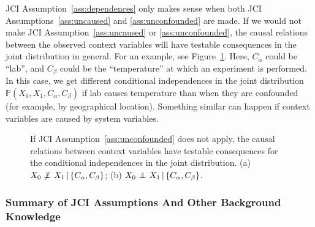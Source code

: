 \documentclass[twoside,11pt]{article}
\DeclareMathOperator*{\CI}{{\,\perp\mkern-12mu\perp\,}}
\DeclareMathOperator*{\nCI}{{\,\not\mkern-1mu\perp\mkern-12mu\perp\,}}
\newcommand{\Prb}{\mathbb{P}}
\newcommand\given{\,|\,}
\begin{document}
JCI Assumption~\ref{ass:dependences} only makes sense when both JCI Assumptions~\ref{ass:uncaused}
and \ref{ass:unconfounded} are made. If we would not make JCI Assumption~\ref{ass:uncaused}
or \ref{ass:unconfounded}, the causal relations between the observed context variables will have testable
consequences in the joint distribution in general. For an example, see Figure~\ref{fig:JCI_ass3_without_ass2}.
Here, $C_\alpha$ could be ``lab'', and $C_\beta$ could be the ``temperature'' at which an experiment is performed. 
In this case, we get different conditional independences in the joint distribution $\Prb(X_0,X_1,C_\alpha,C_\beta)$
if lab causes temperature than when they are confounded (for example, by geographical location). 
Something similar can happen if context variables are caused by system variables.

\begin{figure}\centering
  \caption{If JCI Assumption~\ref{ass:unconfounded} does not apply, the causal relations between context variables have testable consequences for the conditional independences in the joint distribution. (a) $X_0 \nCI X_1 \given \{C_\alpha,C_\beta\}$; (b) $X_0 \CI X_1 \given \{C_\alpha,C_\beta\}$.\label{fig:JCI_ass3_without_ass2}}
\end{figure}

\subsubsection{Summary of JCI Assumptions And Other Background Knowledge}
\end{document}
